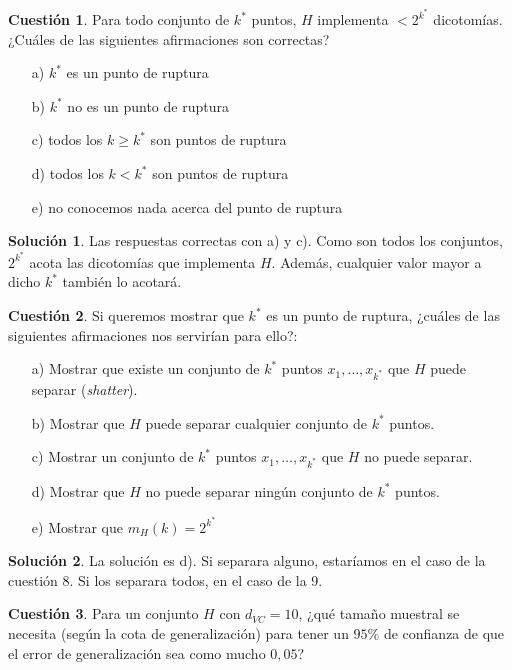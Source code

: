 \documentclass[a4paper, 11pt]{article}
\theoremstyle{definition}
\newtheorem{cuestion}{Cuestión}
\newtheorem*{solucion}{Solución}
\begin{document}
  \begin{cuestion}
  Para todo conjunto de $k^*$ puntos, $H$ implementa $<2^{k^*}$ dicotomías. ¿Cuáles de las siguientes afirmaciones son correctas?
  \begin{enumerate}
  \item[a)] $k^*$ es un punto de ruptura
  \item[b)] $k^*$ no es un punto de ruptura
  \item[c)] todos los $k \geq k^*$ son puntos de ruptura
  \item[d)] todos los $k < k^*$ son puntos de ruptura
  \item[e)] no conocemos nada acerca del punto de ruptura
  \end{enumerate}
  \end{cuestion}

  \begin{solucion}
    Las respuestas correctas con a) y c). Como son todos los conjuntos, $2^{k^*}$ acota las dicotomías que implementa $H$. Además, cualquier valor mayor a dicho $k^*$ también lo acotará.
  \end{solucion}

  \begin{cuestion}
  Si queremos mostrar que $k^*$ es un punto de ruptura, ¿cuáles de las siguientes afirmaciones nos servirían para ello?:
  \begin{enumerate}
  \item[a)] Mostrar que existe un conjunto de $k^*$ puntos $x_1,\ldots,x_{k^*}$ que $H$ puede separar (\emph{shatter}).
  \item[b)] Mostrar que $H$ puede separar cualquier conjunto de $k^*$ puntos.
  \item[c)] Mostrar un conjunto de $k^*$ puntos $x_1,\ldots,x_{k^*}$ que $H$ no puede separar.
  \item[d)] Mostrar que $H$ no puede separar ningún conjunto de $k^*$ puntos.
  \item[e)] Mostrar que $m_H(k)=2^{k^*}$
  \end{enumerate}
  \end{cuestion}

  \begin{solucion}
    La solución es d). Si separara alguno, estaríamos en el caso de la cuestión 8. Si los separara todos, en el caso de la 9.
  \end{solucion}

  \begin{cuestion}
  Para un conjunto $H$ con $d_{VC}=10$, ¿qué tamaño muestral se necesita (según la cota de generalización) para tener un $95\%$ de confianza de que el error de generalización sea como mucho $0,05$?

  \end{cuestion}
\end{document}
